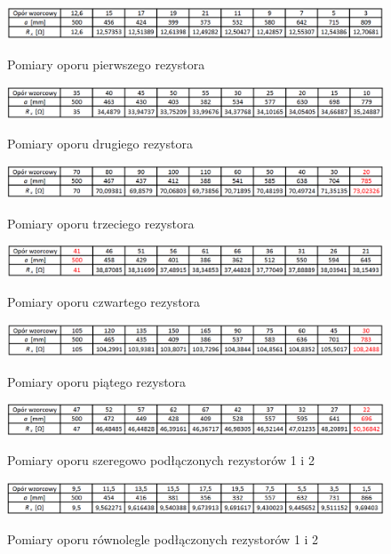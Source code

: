 \documentclass [a4paper,11pt]{article}
\begin{document}
	\begin{figure}[!h]
		\centering
		\caption{Pomiary oporu pierwszego rezystora}
			\includegraphics[width=\textwidth]{R1}
		\label{fig:r1}
	\end{figure}
	\begin{figure}[!h]
		\centering
		\caption{Pomiary oporu drugiego rezystora}
			\includegraphics[width=\textwidth]{R2}
		\label{fig:r2}
	\end{figure}
	\begin{figure}[!h]
		\centering
		\caption{Pomiary oporu trzeciego rezystora}
		\includegraphics[width=\textwidth]{R3}
		\label{fig:r3}
	\end{figure}
	\begin{figure}[!h]
		\centering
		\caption{Pomiary oporu czwartego rezystora}
		\includegraphics[width=\textwidth]{R4}
		\label{fig:r4}
	\end{figure}
	\begin{figure}[!h]
		\centering
		\caption{Pomiary oporu piątego rezystora}
		\includegraphics[width=\textwidth]{R5}
		\label{fig:r5}
	\end{figure}
	\begin{figure}[!h]
		\centering
		\caption{Pomiary oporu szeregowo podłączonych rezystorów 1 i 2}
		\includegraphics[width=\textwidth]{R1+R2}
		\label{fig:r1+r2}
	\end{figure}	
	\begin{figure}[!h]
		\centering
		\caption{Pomiary oporu równolegle podłączonych rezystorów 1 i 2}
		\includegraphics[width=\textwidth]{R1zR2}
		\label{fig:r1zr2}
	\end{figure}
\end{document}
